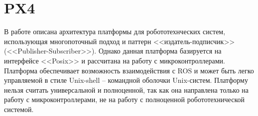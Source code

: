 \section{PX4}

В работе \cite{meier2015px4} описана архитектура платформы для робототехнческих систем, использующая многопоточный подход и паттерн <<издатель-подписчик>> (<<Publisher-Subscriber>>). Однако данная платформа базируется на интерфейсе <<Posix>> и рассчитана на работу с микроконтроллерами. Платформа обеспечивает возможность взаимодействия с ROS и может быть легко управляемой в стиле Unix-shell – командной оболочки Unix-систем. Платформу нельзя считать универсальной и полноценной, так как она направлена только на работу с микроконтроллерами, не на работу с полноценной робототехнической системой.